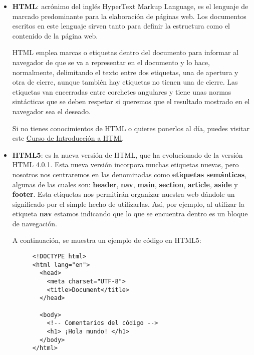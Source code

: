 \begin{itemize}
    \item \textbf{HTML}: acrónimo del inglés HyperText Markup Language,  es el lenguaje de marcado predominante para la elaboración de páginas web. Los documentos escritos en este lenguaje sirven tanto para definir la estructura como el contenido de la página web.

    HTML emplea marcas o etiquetas dentro del documento para informar al navegador de que se va a representar en el documento y lo hace, normalmente, delimitando el texto entre dos etiquetas, una de apertura y otra de cierre, aunque también hay etiquetas no tienen una de cierre. Las etiquetas van encerradas entre corchetes angulares y tiene unas normas sintácticas que se deben respetar si queremos que el resultado mostrado en el navegador sea el deseado.

    Si no tienes conocimientos de HTML o quieres ponerlos al día, puedes visitar este \href{https://es.wikibooks.org/wiki/Lenguaje_HTML}{Curso de Introducción a HTMl}.

    \item \textbf{HTML5}: es la nueva versión de HTML, que ha evolucionado de la versión HTML 4.0.1. Esta nueva versión incorpora muchas etiquetas nuevas, pero nosotros nos centraremos en las denominadas como \textbf{etiquetas semánticas}, algunas de las cuales son: \textbf{header}, \textbf{nav}, \textbf{main}, \textbf{section}, \textbf{article}, \textbf{aside} y \textbf{footer}. Esta etiquetas nos permitirán organizar nuestra web dándole un significado por el simple hecho de utilizarlas. Así, por ejemplo, al utilizar la etiqueta \textbf{nav} estamos indicando que lo que se encuentra dentro es un bloque de navegación.

    A continuación, se muestra un ejemplo de código en HTML5:

    \begin{figure}[H]
        \begin{tcolorbox}[sharp corners, colback=yellow!30, colframe=white!20]
            \scriptsize
\begin{verbatim}
<!DOCTYPE html>
<html lang="en">
  <head>
    <meta charset="UTF-8">
    <title>Document</title>
  </head>

  <body>
    <!-- Comentarios del código -->
    <h1> ¡Hola mundo! </h1>
  </body>
</html>
\end{verbatim}
        \end{tcolorbox}
    \end{figure}


\end{itemize}
